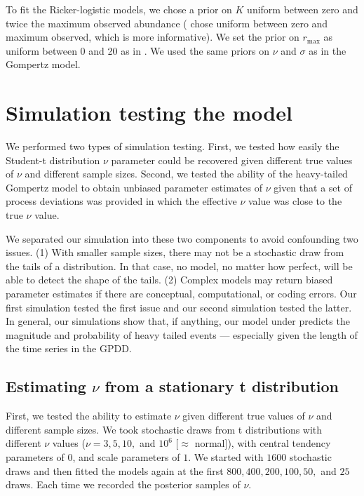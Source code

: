 To fit the Ricker-logistic models, we chose a prior on $K$ uniform between zero and twice the maximum observed abundance (\citet{clark2010} chose uniform between zero and maximum observed, which is more informative). We set the prior on $r_\mathrm{max}$ as uniform between 0 and 20 as in \citet{clark2010}. We used the same priors on $\nu$ and $\sigma$ as in the Gompertz model.

\section{Simulation testing the model}

We performed two types of simulation testing. First, we tested how easily the Student-t distribution $\nu$ parameter could be recovered given different true values of $\nu$ and different sample sizes. Second, we tested the ability of the heavy-tailed Gompertz model to obtain unbiased parameter estimates of $\nu$ given that a set of process deviations was provided in which the effective $\nu$ value was close to the true $\nu$ value.

We separated our simulation into these two components to avoid confounding two issues. (1) With smaller sample sizes, there may not be a stochastic draw from the tails of a distribution. In that case, no model, no matter how perfect, will be able to detect the shape of the tails. (2) Complex models may return biased parameter estimates if there are conceptual, computational, or coding errors. Our first simulation tested the first issue and our second simulation tested the latter. In general, our simulations show that, if anything, our model under predicts the magnitude and probability of heavy tailed events --- especially given the length of the time series in the GPDD.

\subsection{Estimating $\nu$ from a stationary t distribution}

First, we tested the ability to estimate $\nu$ given different true values of $\nu$ and different sample sizes. We took stochastic draws from t distributions with different $\nu$ values ($\nu = 3, 5, 10,$ and $10^6$ [$\approx$ normal]), with central tendency parameters of $0$, and scale parameters of $1$. We started with $1600$ stochastic draws and then fitted the models again at the first $800, 400, 200, 100, 50,$ and $25$ draws. Each time we recorded the posterior samples of $\nu$.

